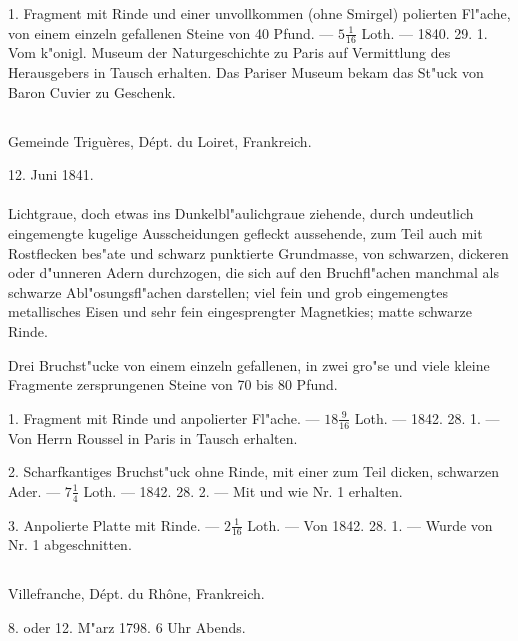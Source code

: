 \documentclass[a4paper, 11pt, oneside, polutonikogreek, german]{article}
\begin{document}
1. Fragment mit Rinde und einer unvollkommen (ohne Smirgel) polierten Fl"ache, von einem einzeln gefallenen Steine von 40 Pfund. --- $5\frac{1}{16}$ Loth. --- 1840. 29. 1. Vom k"onigl. Museum der Naturgeschichte zu Paris auf Vermittlung des Herausgebers in Tausch erhalten. Das Pariser Museum bekam das St"uck von Baron Cuvier zu Geschenk.
\subsection{}
\begin{center}

Gemeinde Triguères, Dépt. du Loiret, Frankreich.

12. Juni 1841.
\end{center}
\paragraph{}
Lichtgraue, doch etwas ins Dunkelbl"aulichgraue ziehende, durch undeutlich eingemengte kugelige Ausscheidungen gefleckt aussehende, zum Teil auch mit Rostflecken bes"ate und schwarz punktierte Grundmasse, von schwarzen, dickeren oder d"unneren Adern durchzogen, die sich auf den Bruchfl"achen manchmal als schwarze Abl"osungsfl"achen darstellen; viel fein und grob eingemengtes metallisches Eisen und sehr fein eingesprengter Magnetkies; matte schwarze Rinde.

Drei Bruchst"ucke von einem einzeln gefallenen, in zwei gro"se und viele kleine Fragmente zersprungenen Steine von 70 bis 80 Pfund.

1. Fragment mit Rinde und anpolierter Fl"ache. --- $18\frac{9}{16}$ Loth. --- 1842. 28. 1. --- Von Herrn Roussel in Paris in Tausch erhalten.

2. Scharfkantiges Bruchst"uck ohne Rinde, mit einer zum Teil dicken, schwarzen Ader. --- $7\frac{1}{4}$ Loth. --- 1842. 28. 2. --- Mit und wie Nr. 1 erhalten.

3. Anpolierte Platte mit Rinde. --- $2\frac{1}{16}$ Loth. --- Von 1842. 28. 1. --- Wurde von Nr. 1 abgeschnitten.
\subsection{}
\begin{center}

Villefranche, Dépt. du Rhône, Frankreich.

8. oder 12. M"arz 1798. 6 Uhr Abends.
\end{center}
\end{document}
